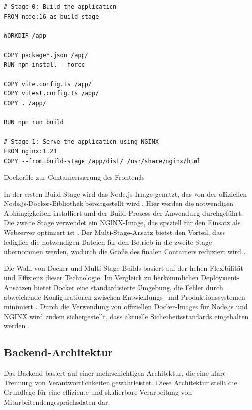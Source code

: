 \begin{listing}[H]
\begin{verbatim}
# Stage 0: Build the application
FROM node:16 as build-stage

WORKDIR /app

COPY package*.json /app/
RUN npm install --force

COPY vite.config.ts /app/
COPY vitest.config.ts /app/
COPY . /app/

RUN npm run build

# Stage 1: Serve the application using NGINX
FROM nginx:1.21
COPY --from=build-stage /app/dist/ /usr/share/nginx/html
\end{verbatim}
\caption{Dockerfile zur Containerisierung des Frontends}
\label{lst:dockerfile_frontend}
\end{listing}

In der ersten Build-Stage wird das Node.js-Image genutzt, das von der offiziellen Node.js-Docker-Bibliothek bereitgestellt wird \cite{node2021docker}. Hier werden die notwendigen Abhängigkeiten installiert und der Build-Prozess der Anwendung durchgeführt. Die zweite Stage verwendet ein NGINX-Image, das speziell für den Einsatz als Webserver optimiert ist \cite{nginx2021docker}. Der Multi-Stage-Ansatz bietet den Vorteil, dass lediglich die notwendigen Dateien für den Betrieb in die zweite Stage übernommen werden, wodurch die Größe des finalen Containers reduziert wird \cite{docker2020mastery}.

Die Wahl von Docker und Multi-Stage-Builds basiert auf der hohen Flexibilität und Effizienz dieser Technologie. Im Vergleich zu herkömmlichen Deployment-Ansätzen bietet Docker eine standardisierte Umgebung, die Fehler durch abweichende Konfigurationen zwischen Entwicklungs- und Produktionssystemen minimiert \cite{docker2019production}. Durch die Verwendung von offiziellen Docker-Images für Node.js und NGINX wird zudem sichergestellt, dass aktuelle Sicherheitsstandards eingehalten werden \cite{node2021docker, nginx2021docker}.



\subsection{Backend-Architektur}
Das Backend basiert auf einer mehrschichtigen Architektur, die eine klare Trennung von Verantwortlichkeiten gewährleistet. Diese Architektur stellt die Grundlage für eine effiziente und skalierbare Verarbeitung von Mitarbeitendengesprächsdaten dar.


